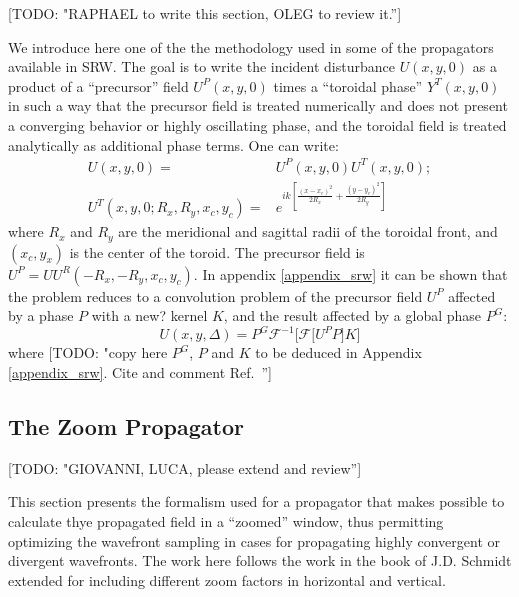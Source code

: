 \documentclass{iucr}              %
\newcommand{\todo}[1]{{\color{red}[TODO: "#1'']}}
\newcommand{\inred}[1]{{\color{red}#1}}
\begin{document}
\todo{RAPHAEL to write this section, OLEG to review it.}

We introduce here one of the the methodology used in some of the propagators available in SRW. The goal is to write the incident disturbance $U(x,y,0)$ as a product of a ``precursor'' field $U^P(x,y,0)$ times a ``toroidal phase'' $Y^T(x,y,0)$ in such a way that the precursor field is treated numerically and does not present a converging behavior or highly oscillating phase, and the toroidal field is treated analytically as additional phase terms. One can write: 
\begin{equation}
\begin{aligned}
U(x,y,0) =& U^P(x,y,0) U^T(x,y,0); \\
U^T(x,y,0;R_x,R_y,x_c,y_c) =& e^{ik [\frac{(x-x_c)^2}{2 R_x} + \frac{(y-y_c)^2}{2 R_y}]}
\end{aligned}
\end{equation}
where $R_x$ and $R_y$ are the meridional and sagittal radii of the toroidal front, and $(x_c,y_x)$ is the center of the toroid. The precursor field is $U^P=U U^R(-R_x,-R_y,x_c,y_c)$. 
In appendix \ref{appendix_srw} it can be shown that the problem reduces to a convolution problem of the precursor field $U^P$ affected by a phase $P$ with a \inred{new?} kernel $K$, and the result affected by a global phase $P^G$: 
\begin{equation}
\label{eq: srw in convolution form}
U(x, y, \Delta) = P^G \mathcal{F}^{-1}\Big[\mathcal{F}\big[U^P P \big] K \Big]
\end{equation}
where \todo{copy here $P^G$, $P$ and $K$ to be deduced in Appendix \ref{appendix_srw}. Cite and comment Ref.~\cite{wyrowski}}


\subsection{The Zoom Propagator}

\todo{GIOVANNI, LUCA, please extend and review}

This section presents the formalism used for a propagator that makes possible to calculate thye propagated field in a ``zoomed'' window, thus permitting optimizing the wavefront sampling in cases for propagating highly convergent or divergent wavefronts. The work here follows the work in the book of J.D. Schmidt \cite{schmidt} extended for including different zoom factors in horizontal and vertical. 
\end{document}
